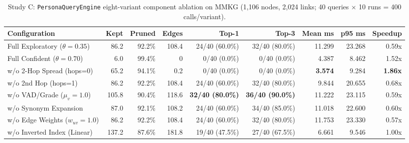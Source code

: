 \documentclass[12pt,a4paper,oneside]{report}
\newcommand{\code}[1]{\texttt{\small #1}}
\begin{document}
\begin{table}[H]
\centering
\caption{Study C: \code{PersonaQueryEngine} eight-variant component ablation on MMKG (1,106 nodes, 2,024 links; 40 queries $\times$ 10 runs = 400 calls/variant).}
\label{tab:mmkg_study_c}
\scriptsize
\setlength{\tabcolsep}{2.2pt}
\begin{tabular}{@{}l rrrrrrrr@{}}
\toprule
Configuration & Kept & Pruned & Edges & Top-1 & Top-3 & Mean ms & p95 ms & Speedup\\
\midrule
Full Exploratory ($\theta=0.35$) & 86.2 & 92.2\% & 108.4 & 24/40 (60.0\%) & 32/40 (80.0\%) & 11.299 & 23.268 & 0.59x\\
Full Confident ($\theta=0.70$) & 6.0 & 99.4\% & 0 & 0/40 (0.0\%) & 0/40 (0.0\%) & 4.387 & 8.462 & 1.52x\\
w/o 2-Hop Spread (hops=0) & 65.2 & 94.1\% & 0.2 & 0/40 (0.0\%) & 0/40 (0.0\%) & \textbf{3.574} & 9.284 & \textbf{1.86x}\\
w/o 2nd Hop (hops=1) & 86.2 & 92.2\% & 108.4 & 24/40 (60.0\%) & 32/40 (80.0\%) & 9.844 & 20.655 & 0.68x\\
w/o VAD/Grade ($\mu_v=1.0$) & 105.8 & 90.4\% & 118.6 & \textbf{32/40 (80.0\%)} & \textbf{36/40 (90.0\%)} & 11.222 & 23.115 & 0.59x\\
w/o Synonym Expansion & 87.0 & 92.1\% & 108.2 & 24/40 (60.0\%) & 34/40 (85.0\%) & 11.018 & 22.600 & 0.60x\\
w/o Edge Weights ($w_{uv}=1.0$) & 86.2 & 92.2\% & 108.4 & 24/40 (60.0\%) & 32/40 (80.0\%) & 11.753 & 23.330 & 0.57x\\
w/o Inverted Index (Linear) & 137.2 & 87.6\% & 181.8 & 19/40 (47.5\%) & 27/40 (67.5\%) & 6.661 & 9.546 & 1.00x\\
\bottomrule
\end{tabular}
\end{table}
\end{document}
